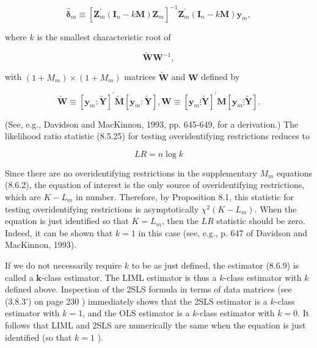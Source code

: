 \documentclass[10pt]{article}
\begin{document}
\begin{equation*}
\hat{\boldsymbol{\delta}}_{m} \equiv\left[\mathbf{Z}_{m}^{\prime}\left(\mathbf{I}_{n}-k \mathbf{M}\right) \mathbf{Z}_{m}\right]^{-1} \mathbf{Z}_{m}^{\prime}\left(\mathbf{I}_{n}-k \mathbf{M}\right) \mathbf{y}_{m}, \tag{8.6.9}
\end{equation*}


where $k$ is the smallest characteristic root of


\begin{equation*}
\tilde{\mathbf{W}} \mathbf{W}^{-1}, \tag{8.6.10}
\end{equation*}


with $\left(1+M_{m}\right) \times\left(1+M_{m}\right)$ matrices $\tilde{\mathbf{W}}$ and $\mathbf{W}$ defined by


\begin{equation*}
\widetilde{\mathbf{W}} \equiv\left[\mathbf{y}_{m}: \widetilde{\mathbf{Y}}\right]^{\prime} \tilde{\mathbf{M}}\left[\mathbf{y}_{m}: \widetilde{\mathbf{Y}}\right], \mathbf{W} \equiv\left[\mathbf{y}_{m} \vdots \tilde{\mathbf{Y}}\right]^{\prime} \mathbf{M}\left[\mathbf{y}_{m} \vdots \tilde{\mathbf{Y}}\right] . \tag{8.6.11}
\end{equation*}


(See, e.g., Davidson and MacKinnon, 1993, pp. 645-649, for a derivation.) The likelihood ratio statistic (8.5.25) for testing overidentifying restrictions reduces to


\begin{equation*}
L R=n \log k \tag{8.6.12}
\end{equation*}


Since there are no overidentifying restrictions in the supplementary $M_{m}$ equations (8.6.2), the equation of interest is the only source of overidentifying restrictions, which are $K-L_{m}$ in number. Therefore, by Proposition 8.1, this statistic for testing overidentifying restrictions is asymptotically $\chi^{2}\left(K-L_{m}\right)$. When the equation is just identified so that $K=L_{m}$, then the $L R$ statistic should be zero. Indeed, it can be shown that $k=1$ in this case (see, e.g., p. 647 of Davidson and MacKinnon, 1993).

If we do not necessarily require $k$ to be as just defined, the estimator (8.6.9) is called a $\boldsymbol{k}$-class estimator. The LIML estimator is thus a $k$-class estimator with $k$ defined above. Inspection of the 2SLS formula in terms of data matrices (see (3.8.3') on page 230 ) immediately shows that the 2SLS estimator is a $k$-class estimator with $k=1$, and the OLS estimator is a $k$-class estimator with $k=0$. It follows that LIML and 2SLS are numerically the same when the equation is just identified (so that $k=1$ ).
\end{document}

